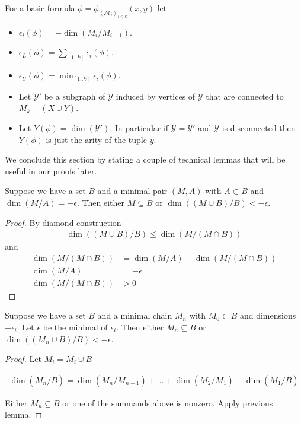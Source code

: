 \documentclass{amsart}
\newcommand{\M}{\mathcal M}
\newcommand{\Y}{\mathcal Y}
\newcommand{\paren}[1]{\left(#1\right)}
\newcommand{\agl}[1]{\left\langle #1 \right\rangle}
\begin{document}
\begin{Definition} \label{def_basic}
  For a basic formula $\phi = \phi_{\agl{\M_i}_{i \leq k}}(x, y)$ let
  \begin{itemize}
  \item $\epsilon_i(\phi) = -\dim \paren{M_i/M_{i-1}}$.
  \item $\epsilon_L(\phi) = \sum_{[1..k]} \epsilon_i(\phi)$.
  \item $\epsilon_U(\phi) = \min_{[1..k]} \epsilon_i(\phi)$.
  \item Let $\Y'$ be a subgraph of $\Y$ induced by vertices of $\Y$ that are connected to $M_k - (X \cup Y)$.
  \item Let $Y(\phi) = \dim (\Y')$.
    In particular if $\Y = \Y'$ and $\Y$ is disconnected then $Y(\phi)$ is just the arity of the tuple $y$.
  \end{itemize}
\end{Definition}

We conclude this section by stating a couple of technical lemmas that will be useful in our proofs later.
\begin{Lemma}
  Suppose we have a set $B$ and a minimal pair $(M, A)$ with $A \subset B$ and $\dim(M/A) = -\epsilon$.
  Then either $M \subseteq B$ or $\dim((M \cup B)/B) < -\epsilon$.
\end{Lemma}

\begin{proof}
  By diamond construction
  \begin{align*}
    \dim((M \cup B)/B) \leq \dim(M / (M \cap B))
  \end{align*}
  and 
  \begin{align*}
    \dim(M / (M \cap B)) &= \dim (M/A) - \dim(M / (M \cap B)) \\
    \dim (M/A) &= -\epsilon \\
    \dim(M / (M \cap B)) &> 0
  \end{align*}
\end{proof}



\begin{Lemma}	\label{chain_lemma}
  Suppose we have a set $B$ and a minimal chain $M_n$ with $M_0 \subset B$ and dimensions $-\epsilon_i$.
  Let $\epsilon$ be the minimal of $\epsilon_i$.
  Then either $M_n \subseteq B$ or $\dim((M_n \cup B)/B) < -\epsilon$.
\end{Lemma}


\begin{proof}
  Let $\bar M_i = M_i \cup B$

  \begin{align*}
    \dim(\bar M_n/B) = \dim(\bar M_n/\bar M_{n-1}) + \ldots + \dim(\bar M_2/\bar M_1) + \dim(\bar M_1/B)
  \end{align*}

  Either $M_n \subseteq B$ or one of the summands above is nonzero.
  Apply previous lemma.
\end{proof}
\end{document}
